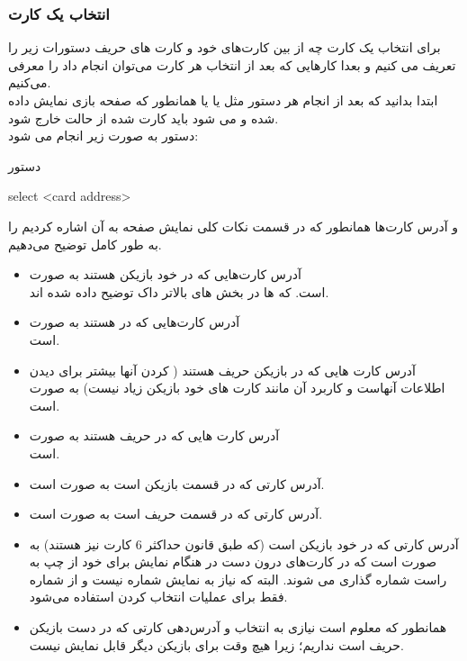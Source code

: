 \documentclass[]{article}
\begin{document}
\subsubsection*{{\titr انتخاب یک کارت}}
برای انتخاب یک کارت چه از بین کارت‌های خود و کارت های حریف دستورات زیر را 
تعریف می کنیم و بعدا کارهایی که بعد از انتخاب هر کارت می‌توان انجام داد را 
معرفی می‌کنیم.
\\
ابتدا بدانید که بعد از انجام هر دستور مثل  یا  یا 
 همانطور که صفحه بازی نمایش داده شده و  می شود باید 
کارت  شده از حالت  خارج شود.
\\
دستور  به صورت زیر انجام می شود:
\begin{mybox}[colback=yellow]{دستور}
	\begin{latin}	
		select <card address>
	\end{latin}
\end{mybox}
و آدرس کارت‌ها همانطور که در قسمت نکات کلی نمایش صفحه به آن اشاره کردیم را 
به طور کامل توضیح می‌دهیم.
\begin{itemize}
	\item
	آدرس کارت‌هایی که در  خود بازیکن هستند به صورت\\
	  است. که  ها در بخش های بالاتر داک توضیح داده شده اند.
	\item
	آدرس کارت‌هایی که در  هستند به صورت\\
	 است. 
	\item
	آدرس کارت هایی که در  بازیکن حریف هستند ( 
	کردن آنها بیشتر برای دیدن اطلاعات آنهاست و کاربرد آن مانند کارت های 
	خود 
	بازیکن زیاد نیست) به صورت  است.
	\item
	آدرس کارت هایی که در  حریف هستند به صورت\\
	  است.
	\item
	آدرس کارتی که در قسمت  بازیکن است به صورت  
	است.
	\item
	آدرس کارتی که در قسمت  حریف است به صورت
	  است.
	\item
	آدرس کارتی که در  خود بازیکن است (که طبق قانون حداکثر 6 کارت 
	نیز هستند) به صورت 
	 است که  در کارت‌های درون دست در هنگام نمایش برای خود از چپ به 
	 راست شماره گذاری می شوند. البته که نیاز به نمایش شماره نیست و از 
	 شماره فقط 
	 برای عملیات انتخاب کردن استفاده می‌شود.
	 \item
	 همانطور که معلوم است نیازی به انتخاب و آدرس‌دهی کارتی که در دست بازیکن 
	 حریف است نداریم؛ زیرا هیچ وقت برای بازیکن دیگر قابل نمایش نیست.	
\end{itemize}
\end{document}
